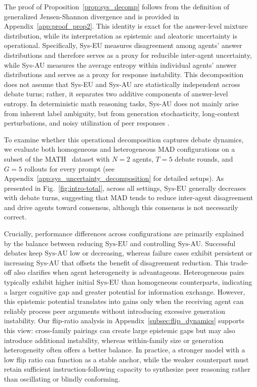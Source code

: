 \documentclass{article}
\theoremstyle{plain}
\theoremstyle{definition}
\theoremstyle{remark}
\begin{document}
The proof of Proposition~\ref{prop:sys_decomp} follows from the definition of generalized Jensen-Shannon divergence and is provided in Appendix~\ref{app:proof_prop2}. This identity is exact for the answer-level mixture distribution, while its interpretation as epistemic and aleatoric uncertainty is operational. Specifically, Sys-EU measures disagreement among agents' answer distributions and therefore serves as a proxy for reducible inter-agent uncertainty, while Sys-AU measures the average entropy within individual agents' answer distributions and serves as a proxy for response instability. This decomposition does not assume that Sys-EU and Sys-AU are statistically independent across debate turns; rather, it separates two additive components of answer-level entropy. In deterministic math reasoning tasks, Sys-AU does not mainly arise from inherent label ambiguity, but from generation stochasticity, long-context perturbations, and noisy utilization of peer responses \cite{feng2025rethinking, ling2024uncertainty}.


To examine whether this operational decomposition captures debate dynamics, we evaluate both homogeneous and heterogeneous MAD configurations on a subset of the MATH~\cite{hendrycks2021measuring} dataset with $N=2$ agents, $T=5$ debate rounds, and $G=5$ rollouts for every prompt (see Appendix~\ref{app:sys_uncertainty_decomposition} for detailed setups). As presented in Fig.~\ref{fig:intro-total}, across all settings, $\mathrm{Sys\mbox{-}EU}$ generally decreases with debate turns, suggesting that MAD tends to reduce inter-agent disagreement and drive agents toward consensus, although this consensus is not necessarily correct.

Crucially, performance differences across configurations are primarily explained by the balance between reducing $\mathrm{Sys\mbox{-}EU}$ and controlling $\mathrm{Sys\mbox{-}AU}$. Successful debates keep $\mathrm{Sys\mbox{-}AU}$ low or decreasing, whereas failure cases exhibit persistent or increasing $\mathrm{Sys\mbox{-}AU}$ that offsets the benefit of disagreement reduction. This trade-off also clarifies when agent heterogeneity is advantageous. Heterogeneous pairs typically exhibit higher initial $\mathrm{Sys\mbox{-}EU}$ than homogeneous counterparts, indicating a larger cognitive gap and greater potential for information exchange. However, this epistemic potential translates into gains only when the receiving agent can reliably process peer arguments without introducing excessive generation instability. Our flip-ratio analysis in Appendix~\ref{subsec:flip_dynamics} supports this view: cross-family pairings can create large epistemic gaps but may also introduce additional instability, whereas within-family size or generation heterogeneity often offers a better balance. In practice, a stronger model with a low flip ratio can function as a stable anchor, while the weaker counterpart must retain sufficient instruction-following capacity to synthesize peer reasoning rather than oscillating or blindly conforming.
\end{document}
